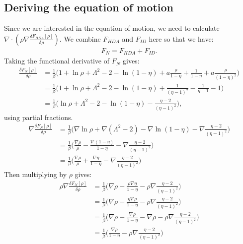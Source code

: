 \documentclass[11pt, a4paper]{article}
\theoremstyle{definition}
\begin{document}
\subsection{Deriving the equation of motion}
Since we are interested in the equation of motion, we need to calculate $ \nabla \cdot \left(\rho \nabla \frac{\delta F_{HDA}[\rho]}{\delta \rho} \right)$. We combine $F_{HDA}$ and $F_{ID}$ here so that we have:
\begin{align*}
	F_{N} = F_{HDA} + F_{ID}.
\end{align*}
Taking the functional derivative of $F_{N}$ gives:
\begin{align*}
	\frac{\delta F_{N}[\rho]}{\delta \rho} &= \frac{1}{\beta} \bigg(1 + \ln \rho + \Lambda^2 -2 - \ln(1-\eta) + a \frac{\rho}{1 - \eta} + \frac{1}{1 - \eta} + a \frac{\rho}{(1 - \eta)^2}  \bigg)\\
	&= \frac{1}{\beta} \bigg(1 + \ln \rho + \Lambda^2 -2 - \ln(1-\eta) + \frac{1}{(\eta - 1)^2} - \frac{1}{\eta - 1}  - 1\bigg)\\
	&= \frac{1}{\beta} \bigg( \ln \rho + \Lambda^2 - 2 - \ln(1-\eta) - \frac{\eta - 2}{(\eta - 1)^2}  \bigg),
\end{align*}
using partial fractions.
\begin{align*}
	\nabla \frac{\delta F_{N}[\rho]}{\delta \rho} &= \frac{1}{\beta} \bigg( \nabla\ln \rho + \nabla(\Lambda^2 - 2) - \nabla\ln(1-\eta) - \nabla\frac{\eta - 2}{(\eta - 1)^2}  \bigg)\\
	& = \frac{1}{\beta} \bigg( \frac{\nabla \rho}{\rho} - \frac{\nabla( 1- \eta)}{1 - \eta} - \nabla\frac{\eta - 2}{(\eta - 1)^2}  \bigg)\\
	& = \frac{1}{\beta} \bigg( \frac{\nabla \rho}{\rho} + \frac{\nabla \eta}{1 - \eta} - \nabla\frac{\eta - 2}{(\eta - 1)^2}  \bigg)
\end{align*}
Then multiplying by $\rho$ gives:
\begin{align*}
	\rho \nabla \frac{\delta F_{N}[\rho]}{\delta \rho} &= \frac{1}{\beta} \bigg( \nabla \rho +   \frac{\rho \nabla \eta}{1 - \eta} - \rho \nabla\frac{\eta - 2}{(\eta - 1)^2}  \bigg)\\
	&= \frac{1}{\beta} \bigg( \nabla \rho +   \frac{\eta\nabla \rho}{1 - \eta} - \rho \nabla\frac{\eta - 2}{(\eta - 1)^2}  \bigg)\\
	&= \frac{1}{\beta} \bigg( \nabla \rho + \frac{\nabla \rho}{1 - \eta} - \nabla \rho - \rho \nabla\frac{\eta - 2}{(\eta - 1)^2}  \bigg)\\
	&= \frac{1}{\beta} \bigg(  \frac{\nabla \rho}{1 - \eta}  - \rho \nabla\frac{\eta - 2}{(\eta - 1)^2}  \bigg)
\end{align*}
\end{document}
